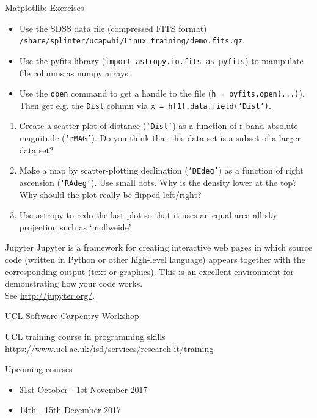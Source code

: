 \documentclass{beamer}
\begin{document}
\begin{frame}[allowframebreaks,t]{Matplotlib: Exercises}

  \begin{itemize}

    \item Use the SDSS data file (compressed FITS format) \texttt{/share/splinter/ucapwhi/Linux\_training/demo.fits.gz}.
  
    \item Use the pyfits library (\texttt{import astropy.io.fits as pyfits}) to manipulate file columns as numpy arrays.
  
    \item Use the \texttt{open} command to get a handle to the file (\texttt{h = pyfits.open(...)}). Then get e.g. the \texttt{Dist} column via \texttt{x = h[1].data.field(`Dist')}.
    
    \end{itemize}
    
    \begin{enumerate}
  
    \item Create a scatter plot of distance (\texttt{`Dist'}) as a function of r-band absolute magnitude (\texttt{`rMAG'}). Do you think that this data set is a subset of a larger data set?
  
    \item Make a map by scatter-plotting declination (\texttt{`DEdeg'}) as a function of right ascension (\texttt{`RAdeg'}). Use small dots. Why is the density lower at the top? Why should the plot really be flipped left/right?
  
    \item Use astropy to redo the last plot so that it uses an equal area all-sky projection such as `mollweide'.
    
  \end{enumerate}
\end{frame}

\begin{frame}{Jupyter}
  Jupyter is a framework for creating interactive web pages in which source code (written in Python or other high-level language) appears together with the corresponding output (text or graphics). This is an excellent environment for demonstrating how your code works.\\
  See \url{http://jupyter.org/}.
\end{frame}

\begin{frame}{UCL Software Carpentry Workshop}
  \begin{block}{UCL training course in programming skills}
    \url{https://www.ucl.ac.uk/isd/services/research-it/training}
  \end{block}
  \begin{block}{Upcoming courses}
    \begin{itemize}
      \item 31st October - 1st November 2017
      \item 14th - 15th December 2017
    \end{itemize}
  \end{block}
\end{frame}
\end{document}
